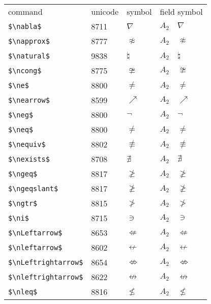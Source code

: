 \documentclass{article}
\begin{document}
\begin{table}
\begin{center}
\begin{tabular}{llll}
 command                    &unicode & symbol                & field symbol\\
 \verb#$\nabla$#              & 8711 & $\nabla$              & $A_2\quad \nabla$\\
 \verb#$\napprox$#            & 8777 & $\napprox$            & $A_2\quad \napprox$\\
 \verb#$\natural$#            & 9838 & $\natural$            & $A_2\quad \natural$\\
 \verb#$\ncong$#              & 8775 & $\ncong$              & $A_2\quad \ncong$\\
 \verb#$\ne$#                 & 8800 & $\ne$                 & $A_2\quad \ne$\\
 \verb#$\nearrow$#            & 8599 & $\nearrow$            & $A_2\quad \nearrow$\\
 \verb#$\neg$#                & 8800 & $\neg$                & $A_2\quad \neg$\\
 \verb#$\neq$#                & 8800 & $\neq$                & $A_2\quad \neq$\\
 \verb#$\nequiv$#             & 8802 & $\nequiv$             & $A_2\quad \nequiv$\\
 \verb#$\nexists$#            & 8708 & $\nexists$            & $A_2\quad \nexists$\\
 \verb#$\ngeq$#               & 8817 & $\ngeq$               & $A_2\quad \ngeq$\\
 \verb#$\ngeqslant$#          & 8817 & $\ngeqslant$          & $A_2\quad \ngeqslant$\\
 \verb#$\ngtr$#               & 8815 & $\ngtr$               & $A_2\quad \ngtr$\\
 \verb#$\ni$#                 & 8715 & $\ni$                 & $A_2\quad \ni$\\
 \verb#$\nLeftarrow$#         & 8653 & $\nLeftarrow$         & $A_2\quad \nLeftarrow$\\
 \verb#$\nleftarrow$#         & 8602 & $\nleftarrow$         & $A_2\quad \nleftarrow$\\
 \verb#$\nLeftrightarrow$#    & 8654 & $\nLeftrightarrow$    & $A_2\quad \nLeftrightarrow$\\
 \verb#$\nleftrightarrow$#    & 8622 & $\nleftrightarrow$    & $A_2\quad \nleftrightarrow$\\
 \verb#$\nleq$#               & 8816 & $\nleq$               & $A_2\quad \nleq$\\

\end{tabular}
\end{center}
\end{table}
\end{document}
